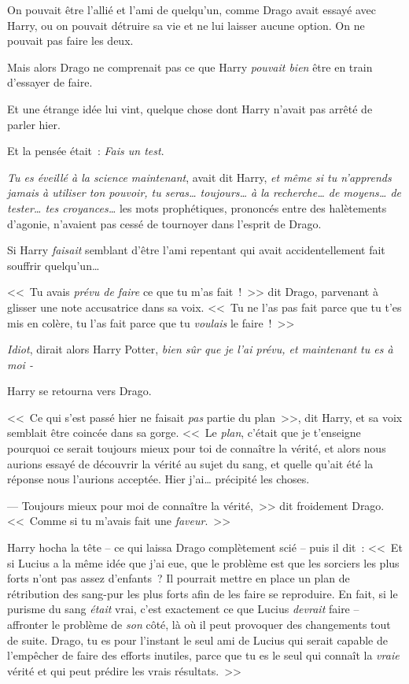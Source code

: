 On pouvait être l'allié et l'ami de quelqu'un, comme Drago avait essayé avec Harry, ou on pouvait détruire sa vie et ne lui laisser aucune option. On ne pouvait pas faire les deux.

Mais alors Drago ne comprenait pas ce que Harry \emph{pouvait bien} être en train d'essayer de faire.

Et une étrange idée lui vint, quelque chose dont Harry n'avait pas arrêté de parler hier.

Et la pensée était~: \emph{Fais un test}.

\emph{Tu es éveillé à la science maintenant}, avait dit Harry, \emph{et même si tu n'apprends jamais à utiliser ton pouvoir, tu seras… toujours… à la recherche… de moyens… de tester… tes croyances…} les mots prophétiques, prononcés entre des halètements d'agonie, n'avaient pas cessé de tournoyer dans l'esprit de Drago.

Si Harry \emph{faisait} semblant d'être l'ami repentant qui avait accidentellement fait souffrir quelqu'un…

<<~Tu avais \emph{prévu de faire} ce que tu m'as fait~!~>> dit Drago, parvenant à glisser une note accusatrice dans sa voix. <<~Tu ne l'as pas fait parce que tu t'es mis en colère, tu l'as fait parce que tu \emph{voulais} le faire~!~>>

\emph{Idiot}, dirait alors Harry Potter, \emph{bien sûr que je l'ai prévu, et maintenant tu es à moi -}

Harry se retourna vers Drago.

<<~Ce qui s'est passé hier ne faisait \emph{pas} partie du plan~>>, dit Harry, et sa voix semblait être coincée dans sa gorge. <<~Le \emph{plan}, c'était que je t'enseigne pourquoi ce serait toujours mieux pour toi de connaître la vérité, et alors nous aurions essayé de découvrir la vérité au sujet du sang, et quelle qu'ait été la réponse nous l'aurions acceptée. Hier j'ai… précipité les choses.

--- Toujours mieux pour moi de connaître la vérité,~>> dit froidement Drago. <<~Comme si tu m'avais fait une \emph{faveur}.~>>

Harry hocha la tête -- ce qui laissa Drago complètement scié -- puis il dit~: <<~Et si Lucius a la même idée que j'ai eue, que le problème est que les sorciers les plus forts n'ont pas assez d'enfants~? Il pourrait mettre en place un plan de rétribution des sang-pur les plus forts afin de les faire se reproduire. En fait, si le purisme du sang \emph{était} vrai, c'est exactement ce que Lucius \emph{devrait} faire -- affronter le problème de \emph{son} côté, là où il peut provoquer des changements tout de suite. Drago, tu es pour l'instant le seul ami de Lucius qui serait capable de l'empêcher de faire des efforts inutiles, parce que tu es le seul qui connaît la \emph{vraie} vérité et qui peut prédire les vrais résultats.~>>

